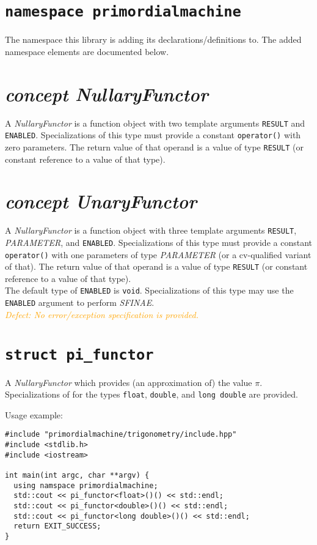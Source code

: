 \documentclass[oneside]{book}
\begin{document}
\section{\texttt{namespace primordialmachine}}
The namespace this library is adding its declarations/definitions to.
The added namespace elements are documented below.

\section{\textit{concept NullaryFunctor}}
A \textit{NullaryFunctor} is a function object with two template arguments \texttt{RESULT} and
\texttt{ENABLED}. Specializations of this type must provide a constant \verb+operator()+ with
zero parameters. The return value of that operand is a value of type \texttt{RESULT} (or constant
reference to a value of that type).\\

\section{\textit{concept UnaryFunctor}}
A \textit{NullaryFunctor} is a function object with three template arguments \texttt{RESULT},
\textit{PARAMETER}, and \texttt{ENABLED}. Specializations of this type must provide a constant
\verb+operator()+ with one parameters of type \textit{PARAMETER} (or a cv-qualified variant of
that). The return value of that operand is a value of type \texttt{RESULT} (or constant
reference to a value of that type).\\

\noindent{}The default type of \verb+ENABLED+ is \verb+void+. Specializations of this type may use
the \verb+ENABLED+ argument to perform \textit{SFINAE}.\\

\noindent{}\textcolor{orange}{\textit{Defect: No error/exception specification is provided.}}

\section{\texttt{struct pi\_functor}}
A \textit{NullaryFunctor} which provides (an approximation of) the value $\pi$.
Specializations of for the types \texttt{float}, \texttt{double}, and \texttt{long double} are provided.

\noindent{}Usage example:
\begin{verbatim}
#include "primordialmachine/trigonometry/include.hpp"
#include <stdlib.h>
#include <iostream>

int main(int argc, char **argv) {
  using namspace primordialmachine;
  std::cout << pi_functor<float>()() << std::endl;
  std::cout << pi_functor<double>()() << std::endl;
  std::cout << pi_functor<long double>()() << std::endl;  
  return EXIT_SUCCESS;
}
\end{verbatim}
\end{document}
